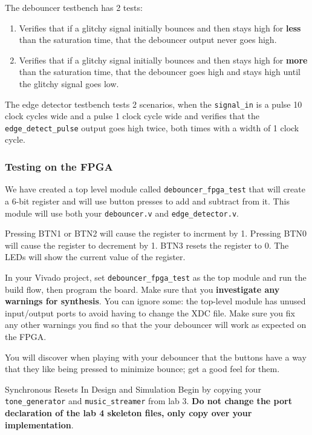 \documentclass[11pt]{article}
\makeatletter
\renewcommand{\section}
{\@startsection {section}{1}{0pt}
 {-2ex}
 {1ex}
 {\bfseries\Large}}
\makeatother
\begin{document}
The debouncer testbench has 2 tests:
\begin{enumerate}
	\item Verifies that if a glitchy signal initially bounces and then stays high for \textbf{less} than the saturation time, that the debouncer output never goes high.
	\item Verifies that if a glitchy signal initially bounces and then stays high for \textbf{more} than the saturation time, that the debouncer goes high and stays high until the glitchy signal goes low.
\end{enumerate}

The edge detector testbench tests 2 scenarios, when the \verb|signal_in| is a pulse 10 clock cycles wide and a pulse 1 clock cycle wide and verifies that the \verb|edge_detect_pulse| output goes high twice, both times with a width of 1 clock cycle.

\subsubsection{Testing on the FPGA}
We have created a top level module called \verb|debouncer_fpga_test| that will create a 6-bit register and will use button presses to add and subtract from it. This module will use both your \verb|debouncer.v| and \verb|edge_detector.v|.

Pressing BTN1 or BTN2 will cause the register to incrment by 1. Pressing BTN0 will cause the register to decrement by 1. BTN3 resets the register to 0. The LEDs will show the current value of the register.

In your Vivado project, set \verb|debouncer_fpga_test| as the top module and run the build flow, then program the board. Make sure that you \textbf{investigate any warnings for synthesis}. You can ignore some: the top-level module has unused input/output ports to avoid having to change the XDC file. Make sure you fix any other warnings you find so that the your debouncer will work as expected on the FPGA.

You will discover when playing with your debouncer that the buttons have a way that they like being pressed to minimize bounce; get a good feel for them.


\section{Synchronous Resets In Design and Simulation}
Begin by copying your \verb|tone_generator| and \verb|music_streamer| from lab 3. \textbf{Do not change the port declaration of the lab 4 skeleton files, only copy over your implementation}.
\end{document}
